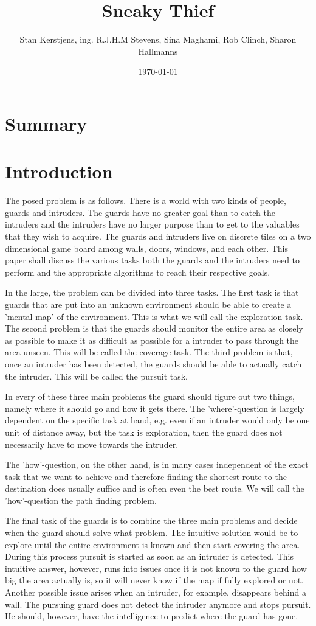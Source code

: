 \documentclass{ba-kecs}
\title{Sneaky Thief}
\author{Stan Kerstjens, ing. R.J.H.M Stevens, Sina Maghami, Rob Clinch, Sharon Hallmanns}
\date{\today}
\begin{document}
\maketitle
\section{Summary}

\section{Introduction}
The posed problem is as follows. There is a world with two kinds of people, guards and intruders. The guards have no greater goal than to catch the intruders and the intruders have no larger purpose than to get to the valuables that they wish to acquire. The guards and intruders live on discrete tiles on a two dimensional game board among walls, doors, windows, and each other. This paper shall discuss the various tasks both the guards and the intruders need to perform and the appropriate algorithms to reach their respective goals.

	In the large, the problem  can be divided into three tasks. The first task is that guards that are put into an unknown environment should be able to create a 'mental map' of the environment. This is what we will call the exploration task. The second problem is that the guards should monitor the entire area as closely as possible to make it as difficult as possible for a intruder to pass through the area unseen. This will be called the coverage task. The third problem is that, once an intruder has been detected, the guards should be able to actually catch the intruder. This will be called the pursuit task.

	In every of these three main problems the guard should figure out two things, namely where it should go and how it gets there. The 'where'-question is largely dependent on the specific task at hand, e.g. even if an intruder would only be one unit of distance away, but the task is exploration, then the guard does not necessarily have to move towards the intruder.

	The 'how'-question, on the other hand, is in many cases independent of the exact task that we want to achieve and therefore finding the shortest route to the destination does usually suffice and is often even the best route. We will call the 'how'-question the path finding problem.

	The final task of the guards is to combine the three main problems and decide when the guard should solve what problem. The intuitive solution would be to explore until the entire environment is known and then start covering the area. During this process pursuit is started as soon as an intruder is detected. This intuitive answer, however, runs into issues once it is not known to the guard how big the area actually is, so it will never know if the map if fully explored or not. Another possible issue arises when an intruder, for example, disappears behind a wall. The pursuing guard does not detect the intruder anymore and stops pursuit. He should, however, have the intelligence to predict where the guard has gone.
	
\end{document}
